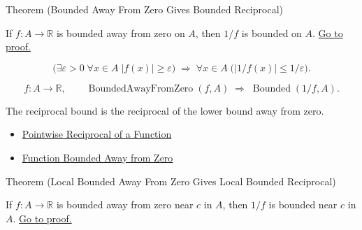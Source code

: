 \begin{theorembox}{Theorem (Bounded Away From Zero Gives Bounded Reciprocal)}
\begin{theorem}
\label{thm:bounded-away-from-zero-gives-bounded-reciprocal}
If \(f:A\to\mathbb{R}\) is bounded away from zero on \(A\), then \(1/f\) is
bounded on \(A\).
\hyperref[prf:bounded-away-from-zero-gives-bounded-reciprocal]{Go to proof.}
\end{theorem}
\end{theorembox}

\begin{remark*}
\[
  \bigl(\exists\varepsilon>0\;\forall x\in A\;|f(x)|\geq\varepsilon\bigr)
  \;\Longrightarrow\;
  \forall x\in A\;\bigl(|1/f(x)|\leq 1/\varepsilon\bigr).
\]
\end{remark*}

\begin{remark*}
\[
  f\colon A\to\mathbb{R},\qquad\operatorname{BoundedAwayFromZero}(f,A)
  \;\Longrightarrow\;
  \operatorname{Bounded}(1/f,A).
\]
\end{remark*}

\begin{remark*}[Interpretation]
The reciprocal bound is the reciprocal of the lower bound away from zero.
\end{remark*}

\begin{dependencies}
\begin{itemize}
  \item \hyperref[def:pointwise-reciprocal-of-a-function]{Pointwise Reciprocal of a Function}
  \item \hyperref[def:function-bounded-away-from-zero]{Function Bounded Away from Zero}
\end{itemize}
\end{dependencies}

\begin{theorembox}{Theorem (Local Bounded Away From Zero Gives Local Bounded Reciprocal)}
\begin{theorem}
\label{thm:local-bounded-away-from-zero-gives-local-bounded-reciprocal}
If \(f:A\to\mathbb{R}\) is bounded away from zero near \(c\) in \(A\), then
\(1/f\) is bounded near \(c\) in \(A\).
\hyperref[prf:local-bounded-away-from-zero-gives-local-bounded-reciprocal]{Go to proof.}
\end{theorem}
\end{theorembox}

